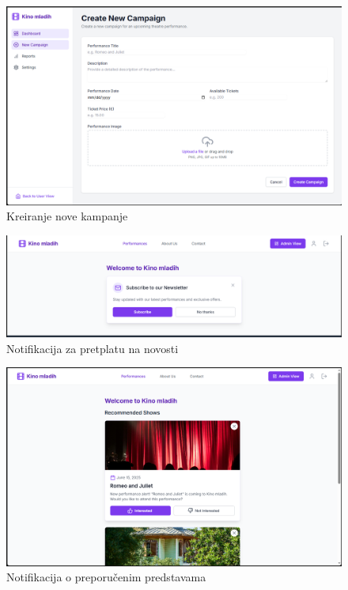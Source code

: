     \begin{figure}[H]
        \centering
        \includegraphics[width=1\linewidth]{Slike/FZ7.2.PNG}
        \caption{Kreiranje nove kampanje}
        \label{fig:fz7.2}
    \end{figure}
    \begin{figure}[H]
        \centering
        \includegraphics[width=1\linewidth]{Slike/FZ7.3.PNG}
        \caption{Notifikacija za pretplatu na novosti}
        \label{fig:fz7.3}
    \end{figure}
    \begin{figure}[H]
        \centering
        \includegraphics[width=1\linewidth]{Slike/FZ7.4.PNG}
        \caption{Notifikacija o preporučenim predstavama}
        \label{fig:fz7.4}
    \end{figure}
\sloppy  


